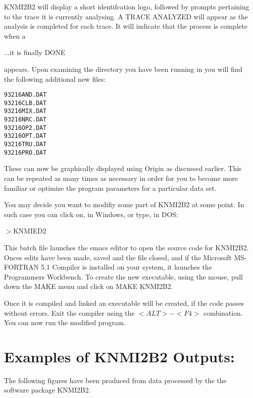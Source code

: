 KNMI2B2 will display a short identifcation logo, followed by 
prompts pertaining to the trace it is currently analysing.
A TRACE ANALYZED will appear as the analysis is completed for each trace.
It will indicate that the process is complete when a 

\begin{center}
		...it is finally DONE 
\end{center}
\noindent
appears. Upon examining the directory you have been running in
you will find the following additional new files:


\noindent
{\tt 93216AND.DAT\\
93216CLB.DAT\\
93216MIX.DAT\\
93216NRC.DAT\\
93216OP2.DAT\\
93216OPT.DAT\\
93216TRU.DAT\\
93216PRO.DAT\\
}


These can now be graphically displayed using Origin as discussed
earlier. This can be repeated as many times as necessary in order
for you to become more familiar or optimize the program parameters
for a particular data set.

You may decide you want to modifiy some part of KNMI2B2 at some
point. In such case you can click on, in Windows, or type, in DOS:

\begin{center}		
			$>$KNMIED2
\end{center}

\noindent
This batch file launches the emacs editor to open the source
code for KNMI2B2. Onces edits have been made, saved and the file 
closed, and if the Microsoft MS-FORTRAN 5.1 Compiler is installed
on your system, it launches the Programmers Workbench. To create
the new executable, using the mouse, pull down the MAKE menu and 
click on MAKE KNMI2B2.

Once it is compiled and linked an executable will be created, if
the code passes without errors. Exit the compiler using the $<ALT>-<F4>$
combination. You can now run the modified program.

\section{Examples of KNMI2B2 Outputs:}

The following figures have been produced from data processed
by the the software package KNMI2B2.

